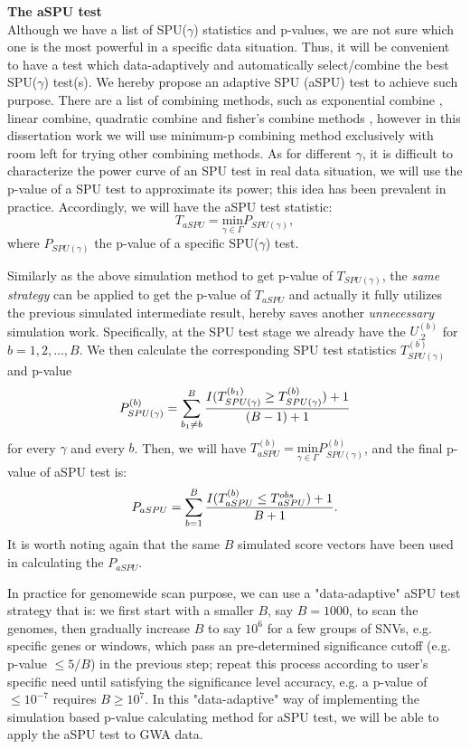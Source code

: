 \documentclass[12pt]{article}
\begin{document}
\textbf{The aSPU test}\\
Although we have a list of SPU($\gamma$) statistics and p-values, we are not sure which one is the most powerful in a specific data situation. Thus, it will be convenient to have a test which data-adaptively and automatically select/combine the best SPU($\gamma$) test(s). We hereby propose an adaptive SPU (aSPU) test to achieve such purpose. There are a list of combining methods, such as exponential combine \cite{Chen2012}, linear combine, quadratic combine and fisher's combine methods \cite{Luo2010,peng2009gene,Derkach2013}, however in this dissertation work we will use minimum-p combining method exclusively with room left for trying other combining methods. As for different $\gamma$, it is difficult to characterize the power curve of an SPU test in real data situation, we will use the p-value of a SPU test to approximate its power; this idea has been prevalent in practice. Accordingly, we will have the aSPU test statistic:
$$
T_{aSPU} = \underset{\gamma\in\Gamma}{ \textrm{min} } P_{ SPU(\gamma) },
$$
where $P_{ SPU(\gamma) }$ the p-value of a specific SPU($\gamma$) test.

Similarly as the above simulation method to get p-value of $T_{ SPU(\gamma) }$, the \textit{same strategy} can be applied to get the p-value of $T_{aSPU}$ and actually it fully utilizes the previous simulated intermediate result, hereby saves another \textit{unnecessary} simulation work. Specifically, at the SPU test stage we already have the $U_{.2}^{ (b) }$ for $b = 1,2,\ldots,B$. We then calculate the corresponding SPU test statistics $T^{ (b) }_{ SPU(\gamma) }$ and p-value 
$$
P^{ (b) }_{ SPU(\gamma) } =  \sum_{b_1 \neq b}^B { I(T^{ (b_1) }_{ SPU(\gamma) } \geq T^{ (b) }_{ SPU(\gamma) } ) + 1  \over (B-1) + 1 } 
$$
for every $\gamma$ and every $b$. Then, we will have $ 
T ^ {(b)} _{aSPU} = \underset{\gamma\in\Gamma}{ \textrm{min} } P^{ (b) }_{ SPU(\gamma) }
$, and the final p-value of aSPU test is:
$$
P_{aSPU} = \sum_{b=1}^B { I(T ^ {(b)} _{aSPU} \leq T ^ {obs} _{aSPU} ) + 1  \over B + 1 }.
$$
It is worth noting again that the same $B$ simulated score vectors have been used in calculating the $P_{aSPU}$. 

In practice for genomewide scan purpose, we can use a "data-adaptive" aSPU test strategy that is: we first start with a smaller $B$, say $B = 1000$, to scan the genomes, then gradually increase $B$ to say $10^6$ for a few groups of SNVs, e.g. specific genes or windows, which pass an pre-determined significance cutoff (e.g. p-value $ \leq 5/B$) in the previous step; repeat this process according to user's specific need until satisfying the significance level accuracy, e.g. a p-value of $\leq 10 ^ {-7}$ requires $B \geq 10^7$. In this "data-adaptive" way of implementing the simulation based p-value calculating method for aSPU test, we will be able to apply the aSPU test to GWA data. 
\end{document}
